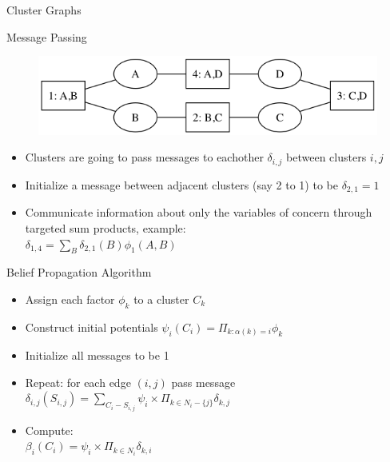 \documentclass{beamer}
\begin{document}
\begin{darkframes}
\begin{frame}{Cluster Graphs}
    \end{frame}
    
    \begin{frame}{Message Passing}
        \begin{figure}
        \includegraphics[scale=0.5]{figures/cluster_graph}
        \end{figure}
    
        \begin{itemize}
         \item Clusters are going to pass messages to eachother \alert{$\delta_{i,j}$} between clusters \alert{$i,j$}
         \item Initialize a message between adjacent clusters (say 2 to 1) to be \alert{$\delta_{2,1} = 1$}
         \item Communicate information about \alert{only the variables of concern} through targeted sum products, example: \\
             \alert{$\delta_{1,4} = \sum_B \delta_{2,1}(B) \phi_1(A,B)$}
         \end{itemize}
    \end{frame}

    \begin{frame}{Belief Propagation Algorithm}
        \begin{itemize}
            \item Assign each factor \alert{$\phi_k$} to a cluster \alert{$C_k$}
            \item Construct initial potentials \alert{$\psi_i(C_i) = \Pi_{k:\alpha(k)=i} \phi_k$}
            \item Initialize all messages to be 1
            \item Repeat: for each edge \alert{$(i,j)$} pass message  \\
                \qquad \alert{$\delta_{i,j}(S_{i,j}) = \sum_{C_i-S_{i,j}} \psi_i \times \Pi_{k \in N_i - \{j\}} \delta_{k,j} $}
            \item Compute: \\
                \alert{ $\beta_i(C_i) = \psi_i \times \Pi_{k \in N_i} \delta_{k,i}$}
                
        \end{itemize}


\end{frame}
\end{darkframes}
\end{document}
